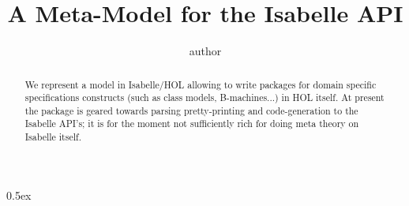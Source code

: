 \documentclass[fontsize=11pt,paper=a4,open=right,twoside,abstract=true]{scrreprt}
\begin{document}
\title{A Meta-Model for the Isabelle API}
\author{%
author
}

\maketitle

  \begin{abstract}
We represent a model in Isabelle/HOL allowing to write packages for
domain specific specifications constructs (such as class models, B-machines...)
in HOL itself. At present the package is geared towards parsing pretty-printing and
code-generation to the Isabelle API's; it is for the moment not sufficiently rich
for doing meta theory on Isabelle itself.
  \end{abstract}
\tableofcontents

\parindent 0pt\parskip 0.5ex



\cite{nipkow.ea:isabelle:2002}



\end{document}
